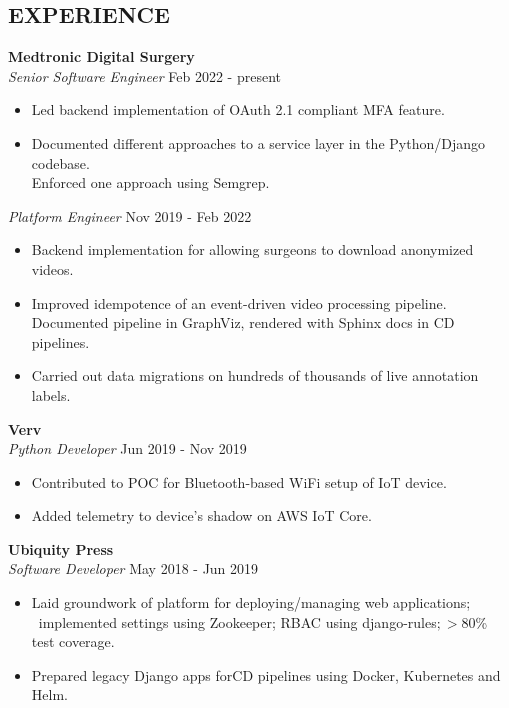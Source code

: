 \documentclass[line,margin]{res}
\begin{document}
\begin{resume}
\section{EXPERIENCE} \textbf{Medtronic Digital Surgery} \\
                {\sl Senior Software Engineer} \hfill   Feb 2022 - present \\
                 \begin{itemize}  \itemsep -2pt %
                   \item Led backend implementation of OAuth 2.1 compliant MFA feature.
                   \item Documented different approaches to a service layer in the Python/Django codebase. \\
                         Enforced one approach using Semgrep. 
                 \end{itemize}
                {\sl Platform Engineer} \hfill          Nov 2019 - Feb 2022 \\
                  \begin{itemize}  \itemsep -2pt %
                  \item Backend implementation for allowing surgeons to download anonymized videos.
                  \item Improved idempotence of an event-driven video processing pipeline. \\
                        Documented pipeline in GraphViz, rendered with Sphinx docs in CD pipelines.
                  \item Carried out data migrations on hundreds of thousands of live annotation labels.
                  \end{itemize} 

                \textbf{Verv} \\
                {\sl Python Developer} \hfill        Jun 2019 - Nov 2019 \\
                  \begin{itemize} \itemsep -2pt %
                  \item Contributed to POC for Bluetooth-based WiFi setup of IoT device.\ 
                  \item Added telemetry to device's shadow on AWS IoT Core. 
                  \end{itemize} 

                \textbf{Ubiquity Press} \\
                {\sl Software Developer} \hfill        May 2018 - Jun 2019 \\
                  \begin{itemize} \itemsep -2pt %
                  \item Laid groundwork of platform for deploying/managing web applications; \
                        implemented settings using Zookeeper; RBAC using django-rules$; > $80\% test coverage.
                  \item Prepared legacy Django apps forCD pipelines using Docker, Kubernetes and Helm. 
                  \end{itemize}
                

\end{resume}
\end{document}

